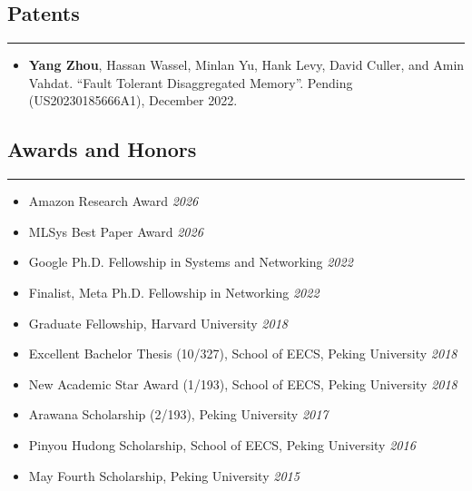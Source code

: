 \documentclass[letterpaper, 11pt]{article}
\newcommand\toRight{\hspace*{0pt}\hfill}
\newcounter{mySaveCounter}
\newcommand\myEnumReset{\setcounter{mySaveCounter}{0}}
\begin{document}
\subsection*{\sc Patents}
\hrule\vspace{0.2cm}
\begin{itemize}
    \setlength{\itemsep}{0pt}%
    \setlength{\parskip}{2pt}%
    \item \textbf{Yang Zhou}, Hassan Wassel, Minlan Yu, Hank Levy, David Culler, and Amin Vahdat. ``Fault Tolerant Disaggregated Memory''. Pending (US20230185666A1), December 2022. 
\end{itemize}
\myEnumReset 

\subsection*{\sc Awards and Honors}
\hrule
\vspace{0.2cm}
\begin{itemize}
    \setlength{\itemsep}{0pt}%
    \setlength{\parskip}{2pt}%
	\item Amazon Research Award \toRight \textit{2026}
	\item MLSys Best Paper Award \toRight \textit{2026}
    \item Google Ph.D. Fellowship in Systems and Networking \toRight \textit{2022}
	\item Finalist, Meta Ph.D. Fellowship in Networking \toRight \textit{2022}
    \item Graduate Fellowship, Harvard University \toRight \textit{2018}
	\item Excellent Bachelor Thesis (10/327), School of EECS, Peking University \toRight \textit{2018}
	\item New Academic Star Award (1/193), School of EECS, Peking University \toRight \textit{2018}
	\item Arawana Scholarship (2/193), Peking University \toRight \textit{2017}
    \item Pinyou Hudong Scholarship, School of EECS, Peking University \toRight \textit{2016}
    \item May Fourth Scholarship, Peking University \toRight \textit{2015}
\end{itemize}
\end{document}
